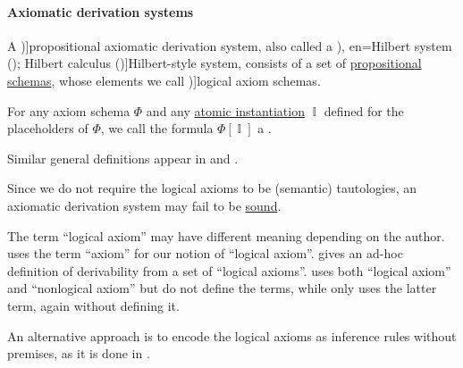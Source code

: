 \paragraph{Axiomatic derivation systems}

\begin{definition}\label{def:propositional_axiomatic_derivation_system}\mimprovised
  A \term[en=axiomatic system (\cite[6D1]{Hindley1997BasicSTT})]{propositional axiomatic derivation system}, also called a \term[ru=исчисление высказываний гильбертовского типа (\cite[46]{Герасимов2014Вычислимость}), en=Hilbert system (\cite[33]{TroelstraSchwichtenberg2000BasicProofTheory}); Hilbert calculus (\cite[103]{Mimram2020ProgramEqualsProof})]{Hilbert-style system}, consists of a set of \hyperref[def:propositional_formula_schema]{propositional schemas}, whose elements we call \term[en=axiom schema (\cite[82]{VanDalen2004LogicAndStructure})]{logical axiom schemas}.

  For any axiom schema \( \Phi \) and any \hyperref[def:atomic_propositional_instantiation]{atomic instantiation} \( \BbbI \) defined for the placeholders of \( \Phi \), we call the formula \( \Phi[\BbbI] \) a .
\end{definition}
\begin{comments}
  \item Similar general definitions appear in \cite[6D1]{Hindley1997BasicSTT} and \textcite[46]{Герасимов2014Вычислимость}.

  \item Since we do not require the logical axioms to be (semantic) tautologies, an axiomatic derivation system may fail to be \hyperref[def:general_logic]{sound}.

  \item The term \enquote{logical axiom} may have different meaning depending on the author. \Textcite[6D1]{Hindley1997BasicSTT} uses the term \enquote{axiom} for our notion of \enquote{logical axiom}. \Textcite[204]{Hinman2005Logic} gives an ad-hoc definition of derivability from a set of \enquote{logical axioms}. \Textcite{TroelstraSchwichtenberg2000BasicProofTheory} uses both \enquote{logical axiom} and \enquote{nonlogical axiom} but do not define the terms, while \textcite{Kleene2002Logic} only uses the latter term, again without defining it.

  \item An alternative approach is to encode the logical axioms as inference rules without premises, as it is done in \cite[103]{Mimram2020ProgramEqualsProof}.
\end{comments}

